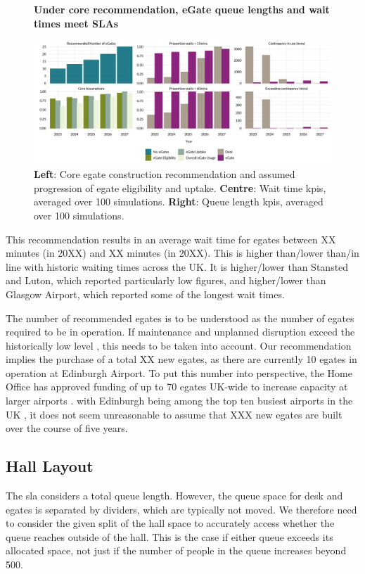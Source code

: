 \documentclass[10pt]{article}
\newcommand*{\figuretitle}[1]{%
    {\centering%
    \textbf{#1}%
    \par\medskip}%
}
\begin{document}
\begin{figure}[!ht]
    \centering
    \figuretitle{Under core recommendation, eGate queue lengths and wait times meet SLAs}
    \includegraphics[width=\textwidth]{figures/core_rec_fig.png}
     \caption{\textbf{Left}: Core \gls{egate} construction recommendation and assumed progression of \gls{egate} eligibility and uptake. \textbf{Centre}: Wait time \glspl{kpi}, averaged over 100 simulations. \textbf{Right}: Queue length \glspl{kpi}, averaged over 100 simulations.} \label{fig:core_rec_fig}
\end{figure}

This recommendation results in an average wait time for \glspl{egate} between XX minutes (in 20XX) and XX minutes (in 20XX). This is higher than/lower than/in line with historic waiting times across the UK. It is higher/lower than Stansted and Luton, which reported particularly low figures, and higher/lower than Glasgow Airport, which reported some of the longest wait times. 

The number of recommended \glspl{egate} is to be understood as the number of \glspl{egate} required to be in operation. If maintenance and unplanned disruption exceed the historically low level \cite{Inspection_eGates}, this needs to be taken into account. Our recommendation implies the purchase of a total XX new \glspl{egate}, as there are currently 10 \glspl{egate} in operation at Edinburgh Airport. To put this number into perspective, the Home Office has approved funding of up to 70 \glspl{egate} UK-wide to increase capacity at larger airports \cite{Inspection_eGates}. with Edinburgh being among the top ten busiest airports in the UK \cite{busiestairport}, it does not seem unreasonable to assume that XXX new \glspl{egate} are built over the course of five years. 


\subsection{Hall Layout}
The \gls{sla} considers a total queue length. However, the queue space for desk and \glspl{egate} is separated by dividers, which are typically not moved. We therefore need to consider the given split of the hall space to accurately access whether the queue reaches outside of the hall. This is the case if either queue exceeds its allocated space, not just if the number of people in the queue increases beyond 500. 
\end{document}
